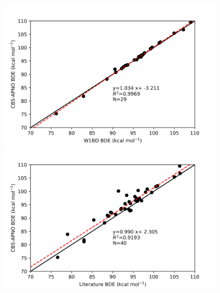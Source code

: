 \begin{doublespace}
\begin{figure}[H]\ContinuedFloat
\hspace*{-1.2cm}
\begin{minipage}{8cm}
  \centering
  \includegraphics[width=\textwidth]{figures/w1bd-cbsapno}
\end{minipage}%
\begin{minipage}{8cm}
  \centering
  \includegraphics[width=\textwidth]{figures/lit-cbsapno}
\end{minipage}


\end{figure}
\end{doublespace}
